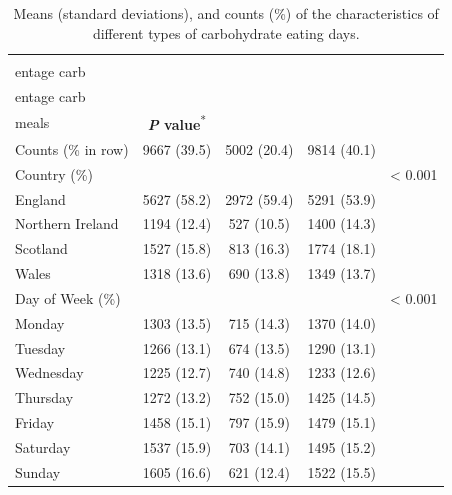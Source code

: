 \begin{table}
	
	\caption{\label{tab:day-level-features}Means (standard deviations), and counts (\%) of the characteristics of different types of carbohydrate eating days.}\vspace{-0.3cm}
	\centering
	\fontsize{9}{11}\selectfont
	\begin{tabular}[t]{lcccc}
		\hiderowcolors
		\toprule
		& \textbf{\Centerstack{High perc-\\entage carb}} & \textbf{\Centerstack{Low perc-\\entage carb}} & \textbf{\Centerstack{Regular\\meals}} & \textbf{\textit{P} value}\textsuperscript{*}\\
		\midrule
		\showrowcolors
		Counts (\% in row) & 9667 (39.5) & 5002 (20.4) & 9814 (40.1) & \\
		Country (\%) &  &  &  & < 0.001\\
		\hspace{1em}England & 5627 (58.2) & 2972 (59.4) & 5291 (53.9) & \\
		\hspace{1em}Northern Ireland & 1194 (12.4) & 527 (10.5) & 1400 (14.3) & \\
		\hspace{1em}Scotland & 1527 (15.8) & 813 (16.3) & 1774 (18.1) & \\
		\hspace{1em}Wales & 1318 (13.6) & 690 (13.8) & 1349 (13.7) & \\
		Day of Week (\%) &  &  &  & < 0.001\\
		\hspace{1em}Monday & 1303 (13.5) & 715 (14.3) & 1370 (14.0) & \\
		\hspace{1em}Tuesday & 1266 (13.1) & 674 (13.5) & 1290 (13.1) & \\
		\hspace{1em}Wednesday & 1225 (12.7) & 740 (14.8) & 1233 (12.6) & \\
		\hspace{1em}Thursday & 1272 (13.2) & 752 (15.0) & 1425 (14.5) & \\
		\hspace{1em}Friday & 1458 (15.1) & 797 (15.9) & 1479 (15.1) & \\
		\hspace{1em}Saturday & 1537 (15.9) & 703 (14.1) & 1495 (15.2) & \\
		\hspace{1em}Sunday & 1605 (16.6) & 621 (12.4) & 1522 (15.5) & \\

\end{tabular}
\end{table}
